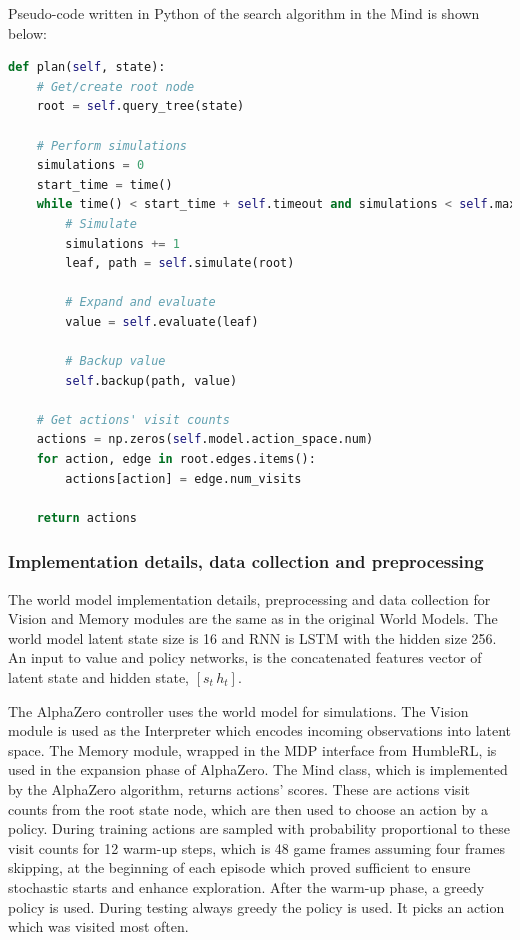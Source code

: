 Pseudo-code written in Python of the search algorithm in the Mind is shown below:

\noindent\begin{minipage}{\textwidth} %
\begin{lstlisting}[language=Python]
def plan(self, state):
    # Get/create root node
    root = self.query_tree(state)

    # Perform simulations
    simulations = 0
    start_time = time()
    while time() < start_time + self.timeout and simulations < self.max_simulations:
        # Simulate
        simulations += 1
        leaf, path = self.simulate(root)

        # Expand and evaluate
        value = self.evaluate(leaf)

        # Backup value
        self.backup(path, value)

    # Get actions' visit counts
    actions = np.zeros(self.model.action_space.num)
    for action, edge in root.edges.items():
        actions[action] = edge.num_visits

    return actions
\end{lstlisting}
\end{minipage}

\subsubsection{Implementation details, data collection and preprocessing}

The world model implementation details, preprocessing and data collection for Vision and Memory modules are the same as in the original World Models. The world model latent state size is 16 and RNN is LSTM \cite{Algo.LSTM} with the hidden size 256. An input to value and policy networks, is the concatenated features vector of latent state and hidden state, $[s_t\,h_t]$.

The AlphaZero controller uses the world model for simulations. The Vision module is used as the Interpreter which encodes incoming observations into latent space. The Memory module, wrapped in the MDP interface from HumbleRL, is used in the expansion phase of AlphaZero. The Mind class, which is implemented by the AlphaZero algorithm, returns actions' scores. These are actions visit counts from the root state node, which are then used to choose an action by a policy. During training actions are sampled with probability proportional to these visit counts for 12 warm-up steps, which is 48 game frames assuming four frames skipping, at the beginning of each episode which proved sufficient to ensure stochastic starts and enhance exploration. After the warm-up phase, a greedy policy is used. During testing always greedy the policy is used. It picks an action which was visited most often.

